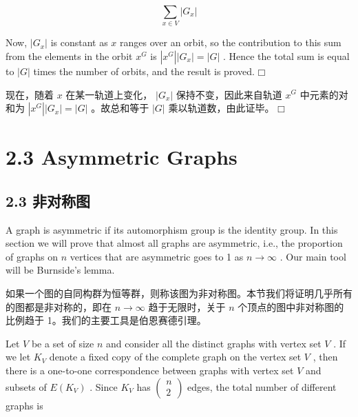 \documentclass[10pt]{article}
\begin{document}
\[
\mathop{\sum }\limits_{{x \in  V}}\left| {G}_{x}\right|
\]

Now, \(\left| {G}_{x}\right|\) is constant as \(x\) ranges over an orbit, so the contribution to this sum from the elements in the orbit \({x}^{G}\) is \(\left| {x}^{G}\right| \left| {G}_{x}\right|  = \left| G\right|\) . Hence the total sum is equal to \(\left| G\right|\) times the number of orbits, and the result is proved. \(□\)

\begin{tcolorbox}\relax
现在，随着 \(x\) 在某一轨道上变化， \(\left| {G}_{x}\right|\) 保持不变，因此来自轨道 \({x}^{G}\) 中元素的对和为 \(\left| {x}^{G}\right| \left| {G}_{x}\right|  = \left| G\right|\) 。故总和等于 \(\left| G\right|\) 乘以轨道数，由此证毕。 \(□\)
\end{tcolorbox}

\section*{2.3 Asymmetric Graphs}

\begin{tcolorbox}\relax
\section*{2.3 非对称图}
\end{tcolorbox}

A graph is asymmetric if its automorphism group is the identity group. In this section we will prove that almost all graphs are asymmetric, i.e., the proportion of graphs on \(n\) vertices that are asymmetric goes to 1 as \(n \rightarrow  \infty\) . Our main tool will be Burnside’s lemma.

\begin{tcolorbox}\relax
如果一个图的自同构群为恒等群，则称该图为非对称图。本节我们将证明几乎所有的图都是非对称的，即在 \(n \rightarrow  \infty\) 趋于无限时，关于 \(n\) 个顶点的图中非对称图的比例趋于 1。我们的主要工具是伯恩赛德引理。
\end{tcolorbox}

Let \(V\) be a set of size \(n\) and consider all the distinct graphs with vertex set \(V\) . If we let \({K}_{V}\) denote a fixed copy of the complete graph on the vertex set \(V\) , then there is a one-to-one correspondence between graphs with vertex set \(V\) and subsets of \(E\left( {K}_{V}\right)\) . Since \({K}_{V}\) has \(\left( \begin{array}{l} n \\  2 \end{array}\right)\) edges, the total number of different graphs is
\end{document}
